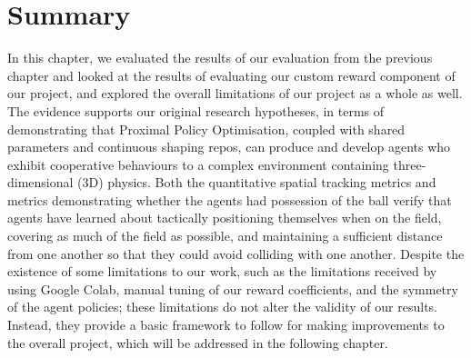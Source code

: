 \section{Summary}
\label{sec:discussion-summary}

In this chapter, we evaluated the results of our evaluation from the previous chapter and looked at the results of evaluating our custom reward component of our project, and explored the overall limitations of our project as a whole as well.
The evidence supports our original research hypotheses, in terms of demonstrating that Proximal Policy Optimisation, coupled with shared parameters and continuous shaping repos, can produce and develop agents who exhibit cooperative behaviours to a complex environment containing three-dimensional (3D) physics. Both the quantitative spatial tracking metrics and metrics demonstrating whether the agents had possession of the ball verify that agents have learned about tactically positioning themselves when on the field, covering as much of the field as possible, and maintaining a sufficient distance from one another so that they could avoid colliding with one another.
Despite the existence of some limitations to our work, such as the limitations received by using Google Colab, manual tuning of our reward coefficients, and the symmetry of the agent policies; these limitations do not alter the validity of our results. Instead, they provide a basic framework to follow for making improvements to the overall project, which will be addressed in the following chapter.